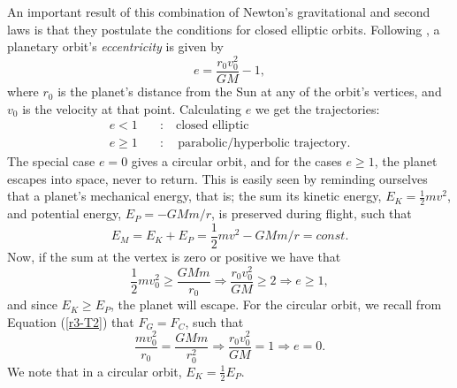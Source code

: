 \documentclass[]{article}
\begin{document}
An important result of this combination of Newton's gravitational and second laws is that they postulate the conditions for closed elliptic orbits. Following \cite{hibbeler2001}, a planetary orbit's \textit{eccentricity} is given by
\begin{equation}
	e = \frac{r_0 v_0^2}{GM} - 1,
\end{equation}
where $r_0$ is the planet's distance from the Sun at any of the orbit's vertices, and $v_0$ is the velocity at that point. Calculating $e$ we get the trajectories:
\begin{equation}
\begin{aligned}
	e < 1 \quad &: \quad \text{closed elliptic} \\
	e \ge 1 \quad &: \quad \text{parabolic/hyperbolic trajectory}.
\end{aligned}
\end{equation}
The special case $e=0$ gives a circular orbit, and for the cases $e \ge 1$, the planet escapes into space, never to return. This is easily seen by reminding ourselves that a planet's mechanical energy, that is; the sum its kinetic energy, $E_K=\frac{1}{2}mv^2$, and potential energy, $E_P=-GMm/r$, is preserved during flight, such that
\begin{equation} \label{mech-const}
E_M = E_K + E_P = \frac{1}{2}mv^2 - GMm/r = const.
\end{equation}
Now, if the sum at the vertex is zero or positive we have that
\begin{equation} \label{e>1}
	\frac{1}{2}mv_0^2 \ge \frac{GMm}{r_0} \Rightarrow \frac{r_0v_0^2}{GM} \ge 2 \Rightarrow e \ge 1,
\end{equation}
and since $E_K \ge E_P$, the planet will escape. For the circular orbit, we recall from Equation (\ref{r3-T2}) that $F_G = F_C$, such that
\begin{equation} \label{e=0}
	\frac{mv_0^2}{r_0} = \frac{GMm}{r_0^2} \Rightarrow \frac{r_0 v_0^2}{GM} = 1 \Rightarrow e = 0.
\end{equation}
We note that in a circular orbit, $E_K = \frac{1}{2} E_P$.
\end{document}
